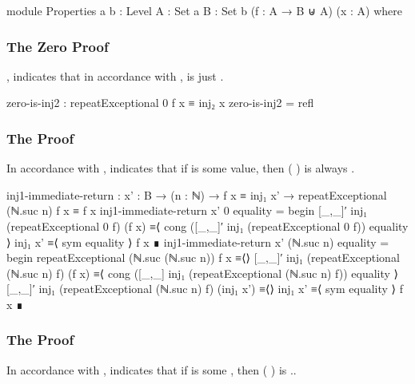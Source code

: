 \documentclass{report}
\begin{document}
\begin{code}
  module Properties
    {a b : Level}
    {A : Set a}
    {B : Set b}
    (f : A → B ⊎ A)
    (x : A) where
\end{code}

\subsubsection{The Zero Proof}
, indicates that in accordance with ,     is just  .

\begin{code}
    zero-is-inj2 : repeatExceptional 0 f x ≡ inj₂ x
    zero-is-inj2 = refl
\end{code}

\subsubsection{The  Proof}
In accordance with ,  indicates that if   is some  value, then  \AgdaSymbol( \AgdaSymbol)   is always  .

\begin{code}
    inj1-immediate-return :
      {x' : B} →
      (n : ℕ) →
      f x ≡ inj₁ x' →
      repeatExceptional (ℕ.suc n) f x ≡ f x
    inj1-immediate-return {x'} 0 equality = begin
      [_,_]′ inj₁ (repeatExceptional 0 f) (f x)
        ≡⟨ cong ([_,_]′ inj₁ (repeatExceptional 0 f)) equality ⟩
      inj₁ x'
        ≡⟨ sym equality ⟩
      f x ∎
    inj1-immediate-return {x'} (ℕ.suc n) equality = begin
      repeatExceptional (ℕ.suc (ℕ.suc n)) f x
        ≡⟨⟩
      [_,_]′ inj₁ (repeatExceptional (ℕ.suc n) f) (f x)
        ≡⟨ cong ([_,_] inj₁ (repeatExceptional (ℕ.suc n) f)) equality ⟩
      [_,_]′ inj₁ (repeatExceptional (ℕ.suc n) f) (inj₁ x')
        ≡⟨⟩
      inj₁ x'
        ≡⟨ sym equality ⟩
      f x ∎
\end{code}

\subsubsection{The  Proof}
In accordance with ,  indicates that if   is some  , then  \AgdaSymbol( \AgdaSymbol)   is    ..
\end{document}
